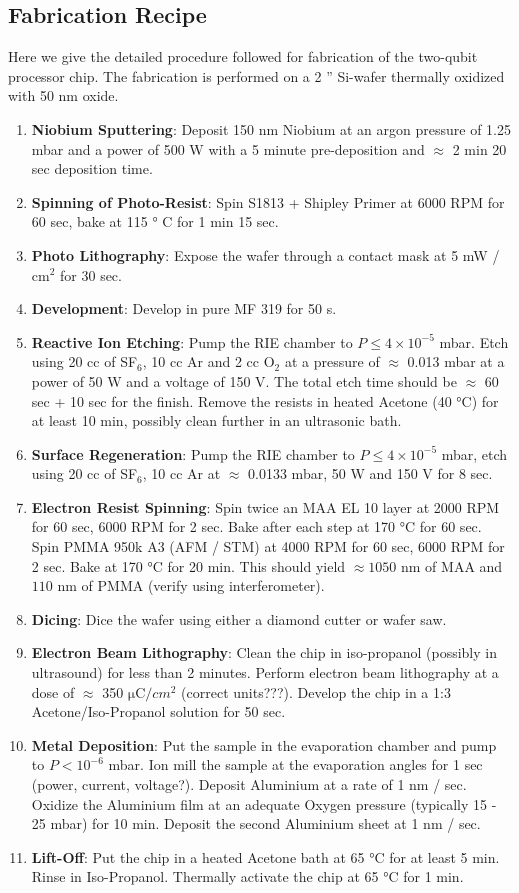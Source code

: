 \subsection{Fabrication Recipe}

Here we give the detailed procedure followed for fabrication of the two-qubit processor chip. The fabrication is performed on a 2 '' Si-wafer thermally oxidized with 50 nm oxide.

\begin{enumerate}
\item \textbf{Niobium Sputtering}: Deposit 150 nm Niobium at an argon pressure of 1.25 mbar and a power of 500 W with a 5 minute pre-deposition and $\approx$ 2 min 20 sec deposition time.
\item \textbf{Spinning of Photo-Resist}: Spin S1813 + Shipley Primer at 6000 RPM for 60 sec, bake at 115 ° C for 1 min 15 sec.
\item \textbf{Photo Lithography}: Expose the wafer through a contact mask at 5 mW / cm$^2$ for 30 sec.
\item \textbf{Development}: Develop in pure MF 319 for 50 s.
\item \textbf{Reactive Ion Etching}: Pump the RIE chamber to $P\le 4\times 10^{-5}$ mbar. Etch using 20 cc of SF$_6$, 10 cc Ar and 2 cc O$_2$ at a pressure of $\approx$ 0.013 mbar at a power of 50 W and a voltage of 150 V. The total etch time should be $\approx $ 60 sec + 10 sec for the finish. Remove the resists in heated Acetone (40 °C) for at least 10 min, possibly clean further in an ultrasonic bath.
\item \textbf{Surface Regeneration}: Pump the RIE chamber  to $P\le 4\times 10^{-5}$ mbar, etch using 20 cc of SF$_6$, 10 cc Ar at $\approx$ 0.0133 mbar, 50 W and 150 V for 8 sec.
\item \textbf{Electron Resist Spinning}: Spin twice an MAA EL 10 layer at 2000 RPM for 60 sec, 6000 RPM for 2 sec. Bake after each step at 170 °C for 60 sec. Spin PMMA 950k A3 (AFM / STM) at 4000 RPM for 60 sec, 6000 RPM for 2 sec. Bake at 170 °C for 20 min. This should yield $\approx 1050$ nm of MAA and $110$ nm of PMMA (verify using interferometer).
\item \textbf{Dicing}: Dice the wafer using either a diamond cutter or wafer saw.
\item \textbf{Electron Beam Lithography}: Clean the chip in iso-propanol (possibly in ultrasound) for less than 2 minutes. Perform electron beam lithography at a dose of $\approx$ 350 $\mathrm{\mu C}/cm^2$ (correct units???). Develop the chip in a 1:3 Acetone/Iso-Propanol solution for 50 sec.
\item \textbf{Metal Deposition}: Put the sample in the evaporation chamber and pump to $P<10^{-6}$ mbar. Ion mill the sample at the evaporation angles for 1 sec (power, current, voltage?). Deposit Aluminium at a rate of 1 nm / sec. Oxidize the Aluminium film at an adequate Oxygen pressure (typically 15 - 25 mbar) for 10 min. Deposit the second Aluminium sheet at 1 nm / sec.
\item \textbf{Lift-Off}: Put the chip in a heated Acetone bath at 65 °C for at least 5 min. Rinse in Iso-Propanol. Thermally activate the chip at 65 °C for 1 min.

\end{enumerate}
